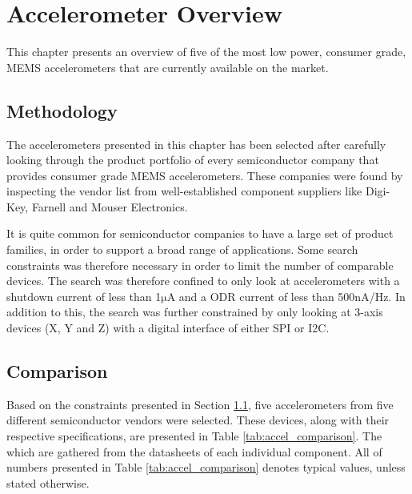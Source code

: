 \chapter{Accelerometer Overview}
\label{chap:overview}

This chapter presents an overview of five of the most low power, consumer grade, MEMS accelerometers that are currently available on the market.

\section{Methodology}
\label{sec:methodology}

The accelerometers presented in this chapter has been selected after carefully looking through the product portfolio of every semiconductor company that provides consumer grade MEMS accelerometers. These companies were found by inspecting the vendor list from well-established component suppliers like Digi-Key, Farnell and Mouser Electronics. 

It is quite common for semiconductor companies to have a large set of product families, in order to support a broad range of applications. Some search constraints was therefore necessary in order to limit the number of comparable devices. The search was therefore confined to only look at accelerometers with a shutdown current of less than 1$\si{\micro\ampere}$ and a ODR current of less than 500$\si{\nano\ampere}$/Hz. In addition to this, the search was further constrained by only looking at 3-axis devices (X, Y and Z) with a digital interface of either SPI or I2C.

\newpage

\section{Comparison}

Based on the constraints presented in Section \ref{sec:methodology}, five accelerometers from five different semiconductor vendors were selected. These devices, along with their respective specifications, are presented in Table \ref{tab:accel_comparison}. The  which are gathered from the datasheets of each individual component. All of numbers presented in Table \ref{tab:accel_comparison} denotes typical values, unless stated otherwise. 


